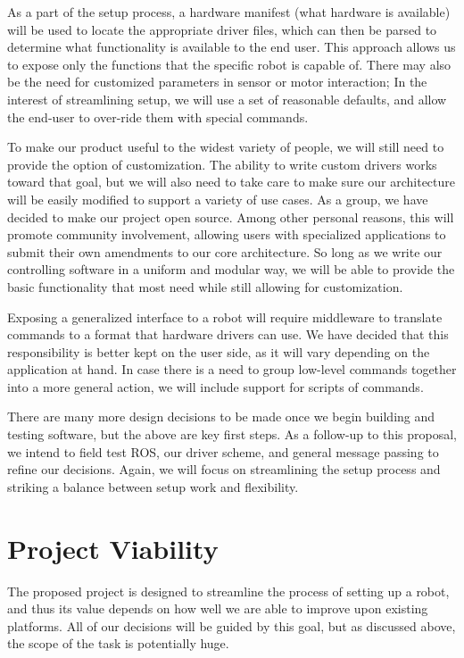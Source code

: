 \documentclass[10pt]{article}
\begin{document}
As a part of the setup process, a hardware manifest (what hardware is available) will be used to locate the appropriate driver files, which can then be parsed to determine what functionality is available to the end user.  This approach allows us to expose only the functions that the specific robot is capable of.  There may also be the need for customized parameters in sensor or motor interaction; In the interest of streamlining setup, we will use a set of reasonable defaults, and allow the end-user to over-ride them with special commands.

To make our product useful to the widest variety of people, we will still need to provide the option of customization.  The ability to write custom drivers works toward that goal, but we will also need to take care to make sure our architecture will be easily modified to support a variety of use cases.  As a group, we have decided to make our project open source.  Among other personal reasons, this will promote community involvement, allowing users with specialized applications to submit their own amendments to our core architecture.  So long as we write our controlling software in a uniform and modular way, we will be able to provide the basic functionality that most need while still allowing for customization.

Exposing a generalized interface to a robot will require middleware to translate commands to a format that hardware drivers can use.  We have decided that this responsibility is better kept on the user side, as it will vary depending on the application at hand.  In case there is a need to group low-level commands together into a more general action, we will include support for scripts of commands.

There are many more design decisions to be made once we begin building and testing software, but the above are key first steps.  As a follow-up to this proposal, we intend to field test ROS, our driver scheme, and general message passing to refine our decisions.  Again, we will focus on streamlining the setup process and striking a balance between setup work and flexibility.

\section{Project Viability}
The proposed project is designed to streamline the process of setting up a robot, and thus its value depends on how well we are able to improve upon existing platforms.  All of our decisions will be guided by this goal, but as discussed above, the scope of the task is potentially huge.
\end{document}
